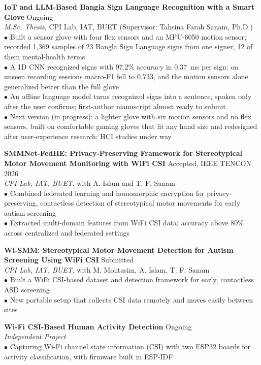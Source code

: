 \documentclass[11pt,a4paper]{article}
\begin{document}
\noindent\textbf{IoT and LLM-Based Bangla Sign Language Recognition with a Smart Glove} \hfill Ongoing\\
\textit{M.Sc. Thesis}, CPI Lab, IAT, BUET (Supervisor: Tahsina Farah Sanam, Ph.D.)\\
$\bullet$ Built a sensor glove with four flex sensors and an MPU-6050 motion sensor; recorded 1,369 samples of 23 Bangla Sign Language signs from one signer, 12 of them mental-health terms\\
$\bullet$ A 1D CNN recognized signs with 97.2\% accuracy in 0.37~ms per sign; on unseen recording sessions macro-F1 fell to 0.733, and the motion sensors alone generalized better than the full glove\\
$\bullet$ An offline language model turns recognized signs into a sentence, spoken only after the user confirms; first-author manuscript almost ready to submit\\
$\bullet$ Next version (in progress): a lighter glove with six motion sensors and no flex sensors, built on comfortable gaming gloves that fit any hand size and redesigned after user-experience research; HCI studies under way

\vspace{6pt}
\noindent\textbf{SMMNet-FedHE: Privacy-Preserving Framework for Stereotypical Motor Movement Monitoring with WiFi CSI} \hfill Accepted, IEEE TENCON 2026\\
\textit{CPI Lab, IAT, BUET}, with A. Islam and T. F. Sanam\\
$\bullet$ Combined federated learning and homomorphic encryption for privacy-preserving, contactless detection of stereotypical motor movements for early autism screening\\
$\bullet$ Extracted multi-domain features from WiFi CSI data; accuracy above 80\% across centralized and federated settings

\vspace{6pt}
\noindent\textbf{Wi-SMM: Stereotypical Motor Movement Detection for Autism Screening Using WiFi CSI} \hfill Submitted\\
\textit{CPI Lab, IAT, BUET}, with M. Mohtasim, A. Islam, T. F. Sanam\\
$\bullet$ Built a WiFi CSI-based dataset and detection framework for early, contactless ASD screening\\
$\bullet$ New portable setup that collects CSI data remotely and moves easily between sites

\vspace{6pt}
\noindent\textbf{Wi-Fi CSI-Based Human Activity Detection} \hfill Ongoing\\
\textit{Independent Project}\\
$\bullet$ Capturing Wi-Fi channel state information (CSI) with two ESP32 boards for activity classification, with firmware built in ESP-IDF
\end{document}
